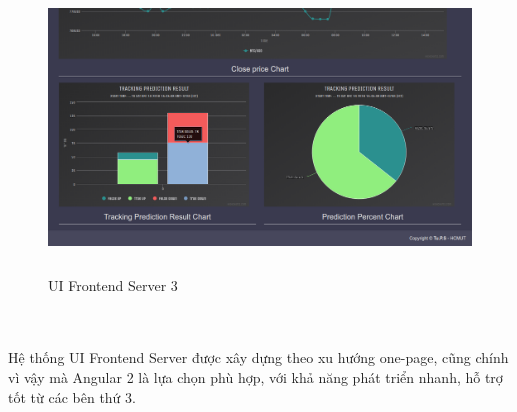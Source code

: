 \begin{figure}[h!]
\centering
\includegraphics[height=3in, keepaspectratio=true]{3.png}
\caption{UI Frontend Server 3}
\end{figure}\\\\
Hệ thống UI Frontend Server được xây dựng theo xu hướng one-page, cũng chính 
vì vậy mà Angular 2 là lựa chọn phù hợp, với khả năng phát triển nhanh, hỗ trợ 
tốt từ các bên thứ 3.
